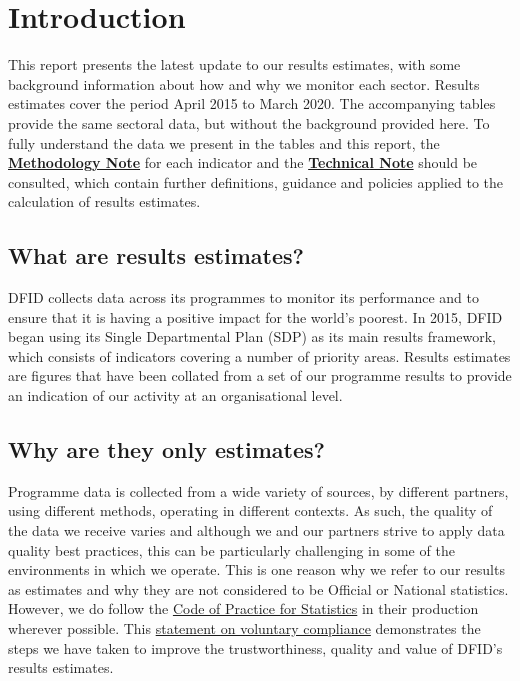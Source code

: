 \chapter*{Introduction}

\thispagestyle{empty}

This report presents the latest update to our results estimates, with some background information about how and why we monitor each sector. %
Results estimates cover the period April 2015 to March 2020. %
The accompanying tables provide the same sectoral data, but without the background provided here. %
To fully understand the data we present in the tables and this report, the \href{https://assets.publishing.service.gov.uk/government/uploads/system/uploads/attachment_data/file/911810/draft-dfid_results-estimates_methodology-notes_2015-2020.pdf}{\textbf{Methodology Note}} for each indicator and the \href{https://assets.publishing.service.gov.uk/government/uploads/system/uploads/attachment_data/file/911809/dfid_results-estimates_technical-notes_2015-2020.pdf}{\textbf{Technical Note}} should be consulted, which contain further definitions, guidance and policies applied to the calculation of results estimates. %


\section*{What are results estimates?}
DFID collects data across its programmes to monitor its performance and to ensure that it is having a positive impact for the world's poorest. %
In 2015, DFID began using its Single Departmental Plan (SDP) as its main results framework, which consists of indicators covering a number of priority areas. %
Results estimates are figures that have been collated from a set of our programme results to provide an indication of our activity at an organisational level. %

\section*{Why are they only estimates?}
Programme data is collected from a wide variety of sources, by different partners, using different methods, operating in different contexts. %
As such, the quality of the data we receive varies and although we and our partners strive to apply data quality best practices, this can be particularly challenging in some of the environments in which we operate. %
This is one reason why we refer to our results as estimates and why they are not considered to be Official or National statistics. %
However, we do follow the \href{https://www.statisticsauthority.gov.uk/code-of-practice/}{Code of Practice for Statistics} in their production wherever possible.  This \href{https://assets.publishing.service.gov.uk/government/uploads/system/uploads/attachment_data/file/819426/DFID-Results-statement-voluntary-comp-Code-Practice-Statistics-2019.pdf}{statement on voluntary compliance} demonstrates the steps we have taken to improve the trustworthiness, quality and value of DFID's results estimates. %

